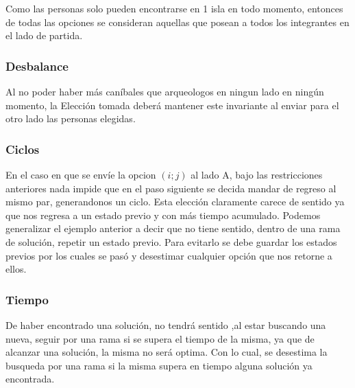 Como las personas solo pueden encontrarse en 1 isla en todo momento, entonces de todas las opciones se consideran aquellas que posean a todos los integrantes en el lado de partida.

\subsubsection*{Desbalance}
Al no poder haber más caníbales que arqueologos en ningun lado en ningún momento, la Elección tomada deberá mantener este invariante al enviar para el otro lado las personas elegidas.

\subsubsection*{Ciclos}
En el caso en que se envíe la opcion $(i; j)$ al lado A, bajo las restricciones anteriores nada impide que en el paso siguiente se decida mandar de regreso al mismo par, generandonos un ciclo. Esta elección claramente carece de sentido ya que nos regresa a un estado previo y con más tiempo acumulado. Podemos generalizar el ejemplo anterior a decir que no tiene sentido, dentro de una rama de solución, repetir un estado previo. Para evitarlo se debe guardar los estados previos por los cuales se pasó y desestimar cualquier opción que nos retorne a ellos.

\subsubsection*{Tiempo}
De haber encontrado una solución, no tendrá sentido ,al estar buscando una nueva, seguir por una rama si se supera el tiempo de la misma, ya que de alcanzar una solución, la misma no será optima. Con lo cual, se desestima la busqueda por una rama si la misma supera en tiempo alguna solución ya encontrada.